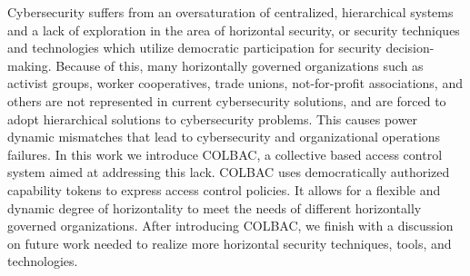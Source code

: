 Cybersecurity suffers from an oversaturation of centralized, hierarchical
systems and a lack of exploration in the area of horizontal security, or
security techniques and technologies which utilize democratic participation for
security decision-making. Because of this, many horizontally governed
organizations such as activist groups, worker cooperatives, trade unions,
not-for-profit associations, and others are not represented in current
cybersecurity solutions, and are forced to adopt hierarchical solutions to
cybersecurity problems. This causes power dynamic mismatches that lead to
cybersecurity and organizational operations failures. In this work we introduce
COLBAC, a collective based access control system aimed at addressing this lack.
COLBAC uses democratically authorized capability tokens to express access
control policies. It allows for a flexible and dynamic degree of horizontality
to meet the needs of different horizontally governed organizations. After
introducing COLBAC, we finish with a discussion on future work needed to realize
more horizontal security techniques, tools, and technologies.
